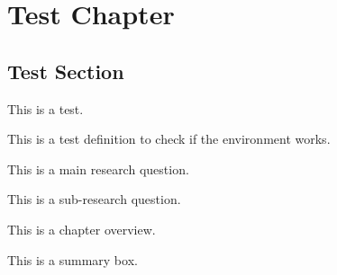 \documentclass[
    fontsize=10pt,
    a4paper,
    twoside=true,
    open=any,
    secnumdepth=2,
    numbers=noenddot,
]{kaobook}
\title{\mytitle}
\author{\myauthor}
\date{\mydate}
\begin{document}
\frontmatter
\tableofcontents

\mainmatter
{}

\chapter{Test Chapter}

\section{Test Section}

This is a test.

\begin{definition}
This is a test definition to check if the environment works.
\end{definition}

\begin{mainrq}
This is a main research question.
\end{mainrq}

\begin{subrq}
This is a sub-research question.
\end{subrq}

\begin{chapteroverview}
This is a chapter overview.
\end{chapteroverview}

\begin{summarybox}
This is a summary box.
\end{summarybox}

\backmatter
\end{document}
